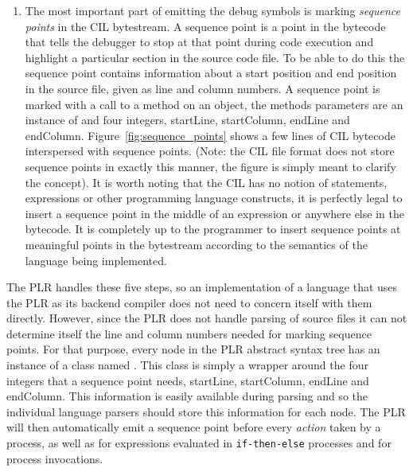 \begin{enumerate}
		\item The most important part of emitting the debug symbols is marking 
		\textit{sequence points} in the CIL bytestream. A sequence point is a 
		point in the bytecode that tells the debugger to stop at that point during 
		code execution and highlight a particular section in the source code file. 
		To be able to do this the sequence point contains information about a 
		start position and end position in the source file, given as line and 
		column numbers. A sequence point is marked with a call to a 
		 method on an  object, the 
		methods parameters are an instance of  and 
		four integers, startLine, startColumn, endLine and endColumn. 
		Figure~\ref{fig:sequence_points} shows a few lines of CIL bytecode 
		interspersed with sequence points. (Note: the CIL file format does not 
		store sequence points in exactly this manner, the figure is simply meant 
		to clarify the concept). It is worth noting that the CIL has no notion of 
		statements, expressions or other programming language constructs, it is 
		perfectly legal to insert a sequence point in the middle of an expression
		or anywhere else in the bytecode. It is completely up to the programmer to
		insert sequence points at meaningful points in the bytestream according to
		the semantics of the language being implemented.
		
 	\end{enumerate}
 	
 	The PLR handles these five steps, so an implementation of a language that 
 	uses the PLR as its backend compiler does not need to concern itself with 
 	them directly. However, since the PLR does not handle parsing of source 
 	files it can not determine itself the line and column numbers needed for 
 	marking sequence points. For that purpose, every node in the PLR abstract 
 	syntax tree has an instance of a class named . This 
 	class is simply a wrapper around the four integers that a sequence point 
 	needs, startLine, startColumn, endLine and endColumn. This information is 
 	easily available during parsing and so the individual language parsers 
 	should store this information for each node. The PLR will then automatically 
 	emit a sequence point before every \textit{action} taken by a process, as 
 	well as for expressions evaluated in \texttt{if-then-else} processes and for 
 	process invocations.

